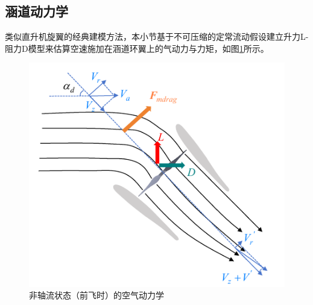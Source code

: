 \subsection{涵道动力学}

类似直升机旋翼的经典建模方法，本小节基于不可压缩的定常流动假设建立升力L-阻力D模型来估算空速施加在涵道环翼上的气动力与力矩\cite{johnsonModelingControlFlight2006b}，如图\ref{非轴流状态}所示。

\begin{figure}[htbp]
	\centering
	\begin{minipage}[c]{1\textwidth}
		\centering
		\includegraphics[scale=1]{Fig/非轴流状态.pdf}
		\caption{\label{非轴流状态}非轴流状态（前飞时）的空气动力学}
	\end{minipage}%
\end{figure}

